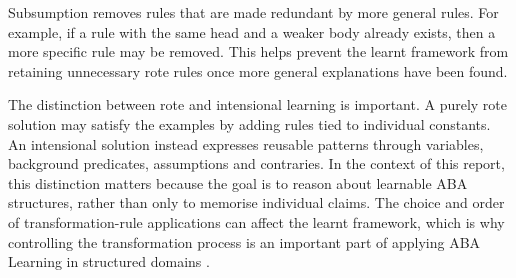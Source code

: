 Subsumption removes rules that are made redundant by more general rules. For example, if a rule with the same head and a weaker body already exists, then a more specific rule may be removed. This helps prevent the learnt framework from retaining unnecessary rote rules once more general explanations have been found.

The distinction between rote and intensional learning is important. A purely rote solution may satisfy the examples by adding rules tied to individual constants. An intensional solution instead expresses reusable patterns through variables, background predicates, assumptions and contraries. In the context of this report, this distinction matters because the goal is to reason about learnable ABA structures, rather than only to memorise individual claims. The choice and order of transformation-rule applications can affect the learnt framework, which is why controlling the transformation process is an important part of applying ABA Learning in structured domains \cite{de2025greedy}.